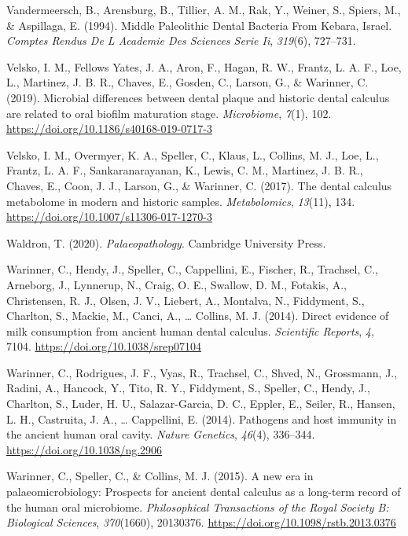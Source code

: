 \documentclass[
  b5paper,
]{book}
\newlength{\cslhangindent}
\newenvironment{CSLReferences}[2] %
 {\begin{list}{}{%
  \setlength{\itemindent}{0pt}
  \setlength{\leftmargin}{0pt}
  \setlength{\parsep}{0pt}
  \ifodd #1
   \setlength{\leftmargin}{\cslhangindent}
   \setlength{\itemindent}{-1\cslhangindent}
  \fi
  \setlength{\itemsep}{#2\baselineskip}}}
 {\end{list}}
\begin{document}
\begin{CSLReferences}{1}{0}
Vandermeersch, B., Arensburg, B., Tillier, A. M., Rak, Y., Weiner, S.,
Spiers, M., \& Aspillaga, E. (1994). Middle {Paleolithic Dental Bacteria
From Kebara}, {Israel}. \emph{Comptes Rendus De L Academie Des Sciences
Serie Ii}, \emph{319}(6), 727--731.

Velsko, I. M., Fellows Yates, J. A., Aron, F., Hagan, R. W., Frantz, L.
A. F., Loe, L., Martinez, J. B. R., Chaves, E., Gosden, C., Larson, G.,
\& Warinner, C. (2019). Microbial differences between dental plaque and
historic dental calculus are related to oral biofilm maturation stage.
\emph{Microbiome}, \emph{7}(1), 102.
\url{https://doi.org/10.1186/s40168-019-0717-3}

Velsko, I. M., Overmyer, K. A., Speller, C., Klaus, L., Collins, M. J.,
Loe, L., Frantz, L. A. F., Sankaranarayanan, K., Lewis, C. M., Martinez,
J. B. R., Chaves, E., Coon, J. J., Larson, G., \& Warinner, C. (2017).
The dental calculus metabolome in modern and historic samples.
\emph{Metabolomics}, \emph{13}(11), 134.
\url{https://doi.org/10.1007/s11306-017-1270-3}

Waldron, T. (2020). \emph{Palaeopathology}. {Cambridge University
Press}.

Warinner, C., Hendy, J., Speller, C., Cappellini, E., Fischer, R.,
Trachsel, C., Arneborg, J., Lynnerup, N., Craig, O. E., Swallow, D. M.,
Fotakis, A., Christensen, R. J., Olsen, J. V., Liebert, A., Montalva,
N., Fiddyment, S., Charlton, S., Mackie, M., Canci, A., \ldots{}
Collins, M. J. (2014). Direct evidence of milk consumption from ancient
human dental calculus. \emph{Scientific Reports}, \emph{4}, 7104.
\url{https://doi.org/10.1038/srep07104}

Warinner, C., Rodrigues, J. F., Vyas, R., Trachsel, C., Shved, N.,
Grossmann, J., Radini, A., Hancock, Y., Tito, R. Y., Fiddyment, S.,
Speller, C., Hendy, J., Charlton, S., Luder, H. U., Salazar-Garcia, D.
C., Eppler, E., Seiler, R., Hansen, L. H., Castruita, J. A., \ldots{}
Cappellini, E. (2014). Pathogens and host immunity in the ancient human
oral cavity. \emph{Nature Genetics}, \emph{46}(4), 336--344.
\url{https://doi.org/10.1038/ng.2906}

Warinner, C., Speller, C., \& Collins, M. J. (2015). A new era in
palaeomicrobiology: Prospects for ancient dental calculus as a long-term
record of the human oral microbiome. \emph{Philosophical Transactions of
the Royal Society B: Biological Sciences}, \emph{370}(1660), 20130376.
\url{https://doi.org/10.1098/rstb.2013.0376}


\end{CSLReferences}
\end{document}

